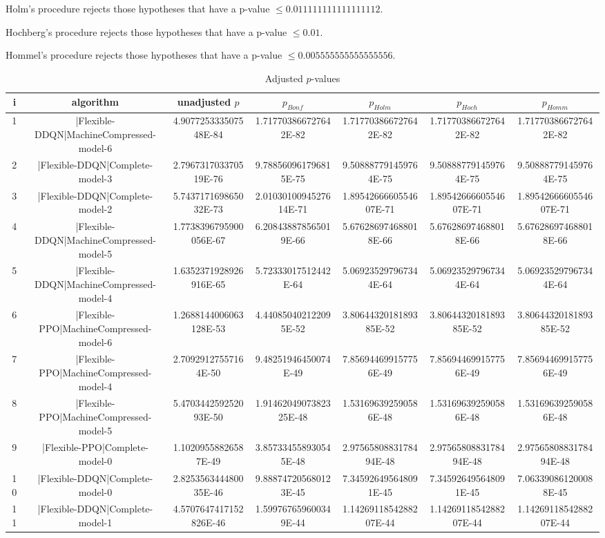 \documentclass[a3paper,10pt]{article}
\begin{document}
Holm's procedure rejects those hypotheses that have a p-value $\le0.011111111111111112$.


Hochberg's procedure rejects those hypotheses that have a p-value $\le0.01$.


Hommel's procedure rejects those hypotheses that have a p-value $\le0.005555555555555556$.


\begin{table}[!htp]
\centering\tiny
\caption{Adjusted $p$-values}
\begin{tabular}{ccccccc}
i&algorithm&unadjusted $p$&$p_{Bonf}$&$p_{Holm}$&$p_{Hoch}$&$p_{Homm}$\\
\hline
1&|Flexible-DDQN|MachineCompressed-model-6&4.907725333507548E-84&1.717703866727642E-82&1.717703866727642E-82&1.717703866727642E-82&1.717703866727642E-82\\
2&|Flexible-DDQN|Complete-model-3&2.796731703370519E-76&9.788560961796815E-75&9.508887791459764E-75&9.508887791459764E-75&9.508887791459764E-75\\
3&|Flexible-DDQN|Complete-model-2&5.743717169865032E-73&2.0103010094527614E-71&1.8954266660554607E-71&1.8954266660554607E-71&1.8954266660554607E-71\\
4&|Flexible-DDQN|MachineCompressed-model-5&1.7738396795900056E-67&6.208438878565019E-66&5.676286974688018E-66&5.676286974688018E-66&5.676286974688018E-66\\
5&|Flexible-DDQN|MachineCompressed-model-4&1.6352371928926916E-65&5.72333017512442E-64&5.069235297967344E-64&5.069235297967344E-64&5.069235297967344E-64\\
6&|Flexible-PPO|MachineCompressed-model-6&1.2688144006063128E-53&4.440850402122095E-52&3.8064432018189385E-52&3.8064432018189385E-52&3.8064432018189385E-52\\
7&|Flexible-PPO|MachineCompressed-model-4&2.70929127557164E-50&9.48251946450074E-49&7.856944699157756E-49&7.856944699157756E-49&7.856944699157756E-49\\
8&|Flexible-PPO|MachineCompressed-model-5&5.470344259252093E-50&1.9146204907382325E-48&1.531696392590586E-48&1.531696392590586E-48&1.531696392590586E-48\\
9&|Flexible-PPO|Complete-model-0&1.10209558826587E-49&3.857334558930545E-48&2.9756580883178494E-48&2.9756580883178494E-48&2.9756580883178494E-48\\
10&|Flexible-DDQN|Complete-model-0&2.825356344480035E-46&9.888747205680123E-45&7.345926495648091E-45&7.345926495648091E-45&7.063390861200088E-45\\
11&|Flexible-DDQN|Complete-model-1&4.5707647417152826E-46&1.599767659600349E-44&1.1426911854288207E-44&1.1426911854288207E-44&1.1426911854288207E-44\\

\end{tabular}
\end{table}
\end{document}
